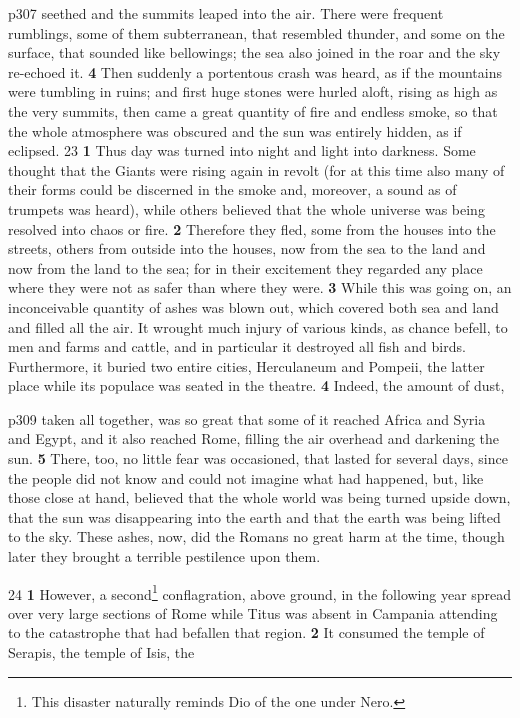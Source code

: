 p307 seethed and the summits leaped into the air. There were frequent rumblings, some of them subterranean, that resembled thunder, and some on the surface, that sounded like bellowings; the sea also joined in the roar and the sky re-echoed it. \textbf{4} Then suddenly a portentous crash was heard, as if the mountains were tumbling in ruins; and first huge stones were hurled aloft, rising as high as the very summits, then came a great quantity of fire and endless smoke, so that the whole atmosphere was obscured and the sun was entirely hidden, as if eclipsed.
23
\textbf{1} Thus day was turned into night and light into darkness. Some thought that the Giants were rising again in revolt (for at this time also many of their forms could be discerned in the smoke and, moreover, a sound as of trumpets was heard), while others believed that the whole universe was being resolved into chaos or fire. \textbf{2} Therefore they fled, some from the houses into the streets, others from outside into the houses, now from the sea to the land and now from the land to the sea; for in their excitement they regarded any place where they were not as safer than where they were. \textbf{3} While this was going on, an inconceivable quantity of ashes was blown out, which covered both sea and land and filled all the air. It wrought much injury of various kinds, as chance befell, to men and farms and cattle, and in particular it destroyed all fish and birds. Furthermore, it buried two entire cities, Herculaneum and Pompeii, the latter place while its populace was seated in the theatre. \textbf{4} Indeed, the amount of dust,

p309 taken all together, was so great that some of it reached Africa and Syria and Egypt, and it also reached Rome, filling the air overhead and darkening the sun. \textbf{5} There, too, no little fear was occasioned, that lasted for several days, since the people did not know and could not imagine what had happened, but, like those close at hand, believed that the whole world was being turned upside down, that the sun was disappearing into the earth and that the earth was being lifted to the sky. These ashes, now, did the Romans no great harm at the time, though later they brought a terrible pestilence upon them.

24
\textbf{1} However, a second\texthebrew{⁠}\footnote{This disaster naturally reminds Dio of the one under Nero.

} conflagration, above ground, in the following year spread over very large sections of Rome while Titus was absent in Campania attending to the catastrophe that had befallen that region. \textbf{2} It consumed the temple of Serapis, the temple of Isis, the

